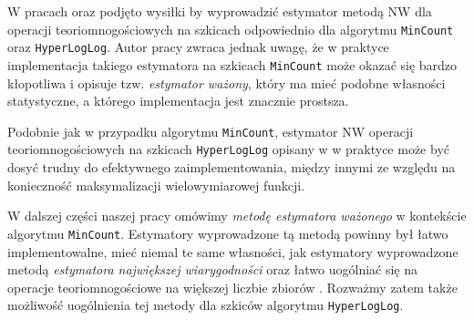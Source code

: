       W pracach \cite{ting} oraz \cite{oertl} podjęto wysiłki
      by wyprowadzić estymator metodą NW dla operacji teoriomnogościowych na szkicach odpowiednio dla algorytmu \texttt{MinCount} oraz \texttt{HyperLogLog}.
      Autor pracy \cite{ting} zwraca jednak uwagę, że
      w praktyce implementacja takiego estymatora na szkicach \texttt{MinCount} może okazać się bardzo kłopotliwa i opisuje tzw. \textit{estymator ważony}, który ma  mieć podobne własności statystyczne, a którego implementacja jest znacznie prostsza. 
  
 Podobnie jak w przypadku algorytmu \texttt{MinCount}, estymator NW operacji teoriomnogościowych na szkicach \texttt{HyperLogLog} opisany w 
 \cite{oertl} w praktyce może być dosyć trudny do efektywnego zaimplementowania, między innymi ze względu na konieczność maksymalizacji wielowymiarowej funkcji.
       
        W dalszej części naszej pracy omówimy  \textit{metodę estymatora ważonego} w kontekście algorytmu 
        \texttt{MinCount}. 
        Estymatory wyprowadzone tą metodą powinny był łatwo implementowalne, mieć niemal te same własności, jak estymatory wyprowadzone metodą \textit{estymatora największej wiarygodności} oraz łatwo uogólniać się na operacje teoriomnogościowe na większej liczbie zbiorów \cite{ting}.         
        Rozważmy zatem także  możliwość uogólnienia tej metody  dla szkiców algorytmu \texttt{HyperLogLog}.
        
        

       
       
       
